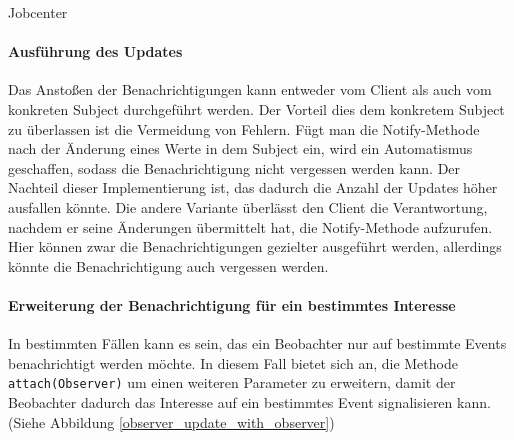 \begin{listing}[h!]
   \centering
   \caption{Jobcenter}
    \label{observer_update}
\end{listing} 

\paragraph{Ausführung des Updates} Das Anstoßen der Benachrichtigungen kann entweder vom Client als auch vom konkreten Subject durchgeführt werden. Der Vorteil dies dem konkretem Subject zu überlassen ist die Vermeidung von Fehlern. Fügt man die Notify-Methode nach der Änderung eines Werte in dem Subject ein, wird ein Automatismus geschaffen, sodass die Benachrichtigung nicht vergessen werden kann. Der Nachteil dieser Implementierung ist, das dadurch die Anzahl der Updates höher ausfallen könnte. Die andere Variante überlässt den Client die Verantwortung, nachdem er seine Änderungen übermittelt hat, die Notify-Methode aufzurufen. Hier können zwar die Benachrichtigungen gezielter ausgeführt werden, allerdings könnte die Benachrichtigung auch vergessen werden.



\paragraph{Erweiterung der Benachrichtigung für ein bestimmtes Interesse} In bestimmten Fällen kann es sein, das ein Beobachter nur auf bestimmte Events benachrichtigt werden möchte. In diesem Fall bietet sich an,  die Methode \texttt{attach(Observer)} um einen weiteren Parameter zu erweitern, damit der Beobachter dadurch das Interesse auf ein bestimmtes Event signalisieren kann. (Siehe Abbildung \ref{observer_update_with_observer})

